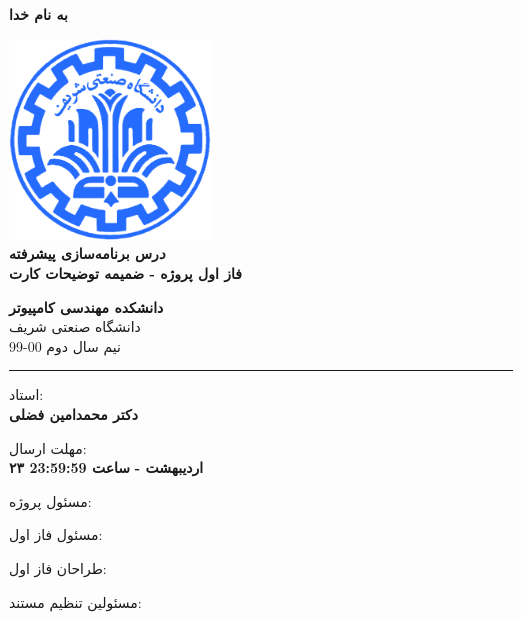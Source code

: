 \documentclass[]{article}
\begin{document}
\begin{titlepage}
\begin{center}

\textbf{ \Huge{به نام خدا} }
        
\vspace{0.2cm}

\includegraphics[width=0.4\textwidth]{sharif1.png}\\
\vspace{0.2cm}
\textbf{ \Huge{\emph درس برنامه‌سازی پیشرفته} }\\
\vspace{0.25cm}
\textbf{ \Large{ فاز اول پروژه - ضمیمه توضیحات کارت} }
\vspace{0.2cm}
       
 
      \large \textbf{دانشکده مهندسی کامپیوتر}\\\vspace{0.1cm}
    \large   دانشگاه صنعتی شریف\\\vspace{0.2cm}
       \large   ﻧﯿﻢ سال دوم 00-99 \\\vspace{0.10cm}
      \noindent\rule[1ex]{\linewidth}{1pt}
استاد:\\
    \textbf{{دکتر محمدامین فضلی}}



    \vspace{0.20cm}

   مهلت ارسال:\\
    \textbf{{۲۳ اردیبهشت - }}
    \textbf{{ساعت 23:59:59}}

    \vspace{0.10cm}
مسئول پروژه:\\
    \textbf{}
    
        \vspace{0.10cm}
مسئول فاز اول:\\
    \textbf{}
    
        \vspace{0.10cm}
طراحان فاز اول:\\
    \textbf{}
    
        \vspace{0.05cm}
مسئولین تنظیم مستند:\\
    \textbf{}
    

\end{center}
\end{titlepage}
\end{document}
